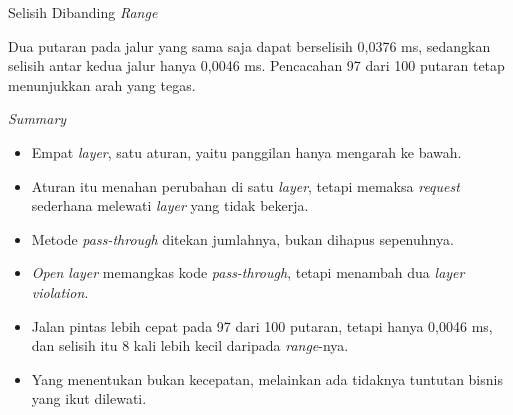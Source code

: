 \documentclass[aspectratio=169, table, 12pt]{beamer}
\begin{document}
\begin{frame}{{\Large Selisih Dibanding \textit{Range}}}
  \vspace{10pt}
  \centering

  \vspace{10pt}
  {\small Dua putaran pada jalur yang sama saja dapat berselisih 0,0376 ms,
  sedangkan selisih antar kedua jalur hanya 0,0046 ms. Pencacahan 97 dari 100
  putaran tetap menunjukkan arah yang tegas.}
\end{frame}

\begin{frame}{{\Large \textit{Summary}}}
  \vspace{10pt}
  \begin{itemize}
    \item Empat \textit{layer}, satu aturan, yaitu panggilan hanya mengarah ke bawah.
    \item Aturan itu menahan perubahan di satu \textit{layer}, tetapi memaksa
          \textit{request} sederhana melewati \textit{layer} yang tidak bekerja.
    \item Metode \textit{pass-through} ditekan jumlahnya, bukan dihapus
          sepenuhnya.
    \item \textit{Open layer} memangkas kode \textit{pass-through}, tetapi menambah
          dua \textit{layer violation}.
    \item Jalan pintas lebih cepat pada 97 dari 100 putaran, tetapi hanya
          0,0046 ms, dan selisih itu 8 kali lebih kecil daripada \textit{range}-nya.
    \item Yang menentukan bukan kecepatan, melainkan ada tidaknya tuntutan
          bisnis yang ikut dilewati.
  \end{itemize}
\end{frame}
\end{document}
